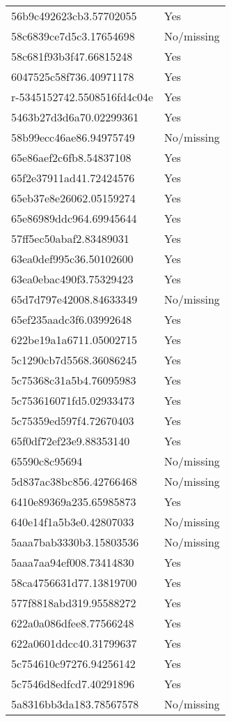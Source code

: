 \begin{tabular}{ll}
56b9c492623cb3.57702055 & Yes \\
58c6839ce7d5c3.17654698 & No/missing \\
58c681f93b3f47.66815248 & Yes \\
6047525c58f736.40971178 & Yes \\
r-5345152742.5508516fd4c04e & Yes \\
5463b27d3d6a70.02299361 & Yes \\
58b99ecc46ae86.94975749 & No/missing \\
65e86aef2c6fb8.54837108 & Yes \\
65f2e37911ad41.72424576 & Yes \\
65eb37e8e26062.05159274 & Yes \\
65e86989ddc964.69945644 & Yes \\
57ff5ec50abaf2.83489031 & Yes \\
63ea0def995c36.50102600 & Yes \\
63ea0ebac490f3.75329423 & Yes \\
65d7d797e42008.84633349 & No/missing \\
65ef235aadc3f6.03992648 & Yes \\
622be19a1a6711.05002715 & Yes \\
5c1290cb7d5568.36086245 & Yes \\
5c75368c31a5b4.76095983 & Yes \\
5c753616071fd5.02933473 & Yes \\
5c75359ed597f4.72670403 & Yes \\
65f0df72ef23e9.88353140 & Yes \\
65590c8c95694 & No/missing \\
5d837ac38bc856.42766468 & No/missing \\
6410e89369a235.65985873 & Yes \\
640e14f1a5b3e0.42807033 & No/missing \\
5aaa7bab3330b3.15803536 & No/missing \\
5aaa7aa94ef008.73414830 & Yes \\
58ca4756631d77.13819700 & Yes \\
577f8818abd319.95588272 & Yes \\
622a0a086dfee8.77566248 & Yes \\
622a0601ddcc40.31799637 & Yes \\
5c754610c97276.94256142 & Yes \\
5c7546d8edfcd7.40291896 & Yes \\
5a8316bb3da183.78567578 & No/missing \\

\end{tabular}
